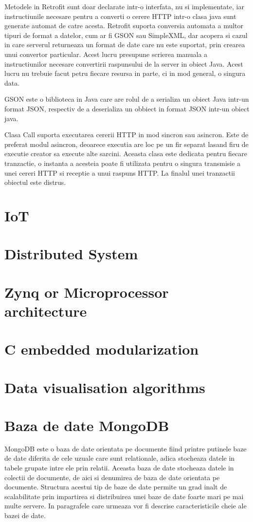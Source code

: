 Metodele in Retrofit sunt doar declarate intr-o interfata, nu si implementate, iar instructiunile necesare pentru a converti o cerere HTTP intr-o clasa java 
sunt generate automat de catre acesta. Retrofit suporta conversia automata a multor tipuri de format a datelor, cum ar fi GSON sau SimpleXML, dar acopera si 
cazul in care serverul returneaza un format de date care nu este suportat, prin crearea unui convertor particular. Acest lucru presupune scrierea 
manuala a instructiunilor necesare convertirii raspunsului de la server in obiect Java. Acest lucru nu trebuie facut petru fiecare resursa in parte, ci 
in mod general, o singura data.

GSON este o biblioteca in Java care are rolul de a serializa un obiect Java intr-un format JSON, respectiv de a deserializa un obbiect in format JSON intr-un 
obiect java.   

Clasa Call suporta executarea cererii HTTP in mod sincron sau asincron. Este de preferat modul asincron, deoarece executia are loc pe un fir separat lasand 
firu de executie creator sa execute alte sarcini. Aceasta clasa este dedicata pentru fiecare tranzactie, o instanta a acesteia poate fi utilizata pentru 
o singura transmisie a unei cereri HTTP si receptie a unui raspuns HTTP. La finalul unei tranzactii obiectul este distrus.



\section{IoT}\label{sec:iot}
\section{Distributed System}\label{sec:distributed}
\section{Zynq or Microprocessor architecture}\label{sec:zynq}
\section{C embedded modularization}\label{sec:cembedded}
\section{Data visualisation algorithms}\label{sec:graph}
\section{Baza de date MongoDB}\label{sec:mongodb}
MongoDB este o baza de date orientata pe documente fiind printre putinele baze de date diferita de cele uzuale care sunt relationale, adica stocheaza datele in tabele 
grupate intre ele prin relatii. Aceasta baza de date stocheaza datele in colectii de documente, de aici si denumirea de baza de date orientata pe documente. 
Structura acestui tip de baze de date permite un grad inalt de scalabilitate prin impartirea si distribuirea unei baze de date foarte mari pe mai multe 
servere. In paragrafele care urmeaza vor fi descrise caracteristicile cheie ale bazei de date.

